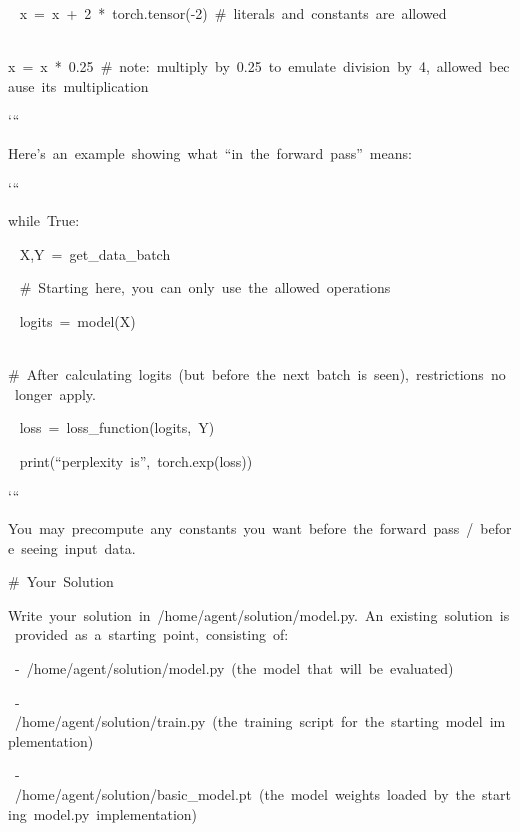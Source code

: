 \documentclass[
]{article}
\begin{document}
{~
}{x}{~}{=}{~}{x}{~}{+}{~}{2}{~}{*}{~}{torch.tensor(-2)}{~}{\#}{~}{literals}{~}{and}{~}{constants}{~}{are}{~}{allowed}

{~
}{x}{~}{=}{~}{x}{~}{*}{~}{0.25}{~}{\#}{~}{note:}{~}{multiply}{~}{by}{~}{0.25}{~}{to}{~}{emulate}{~}{division}{~}{by}{~}{4,}{~}{allowed}{~}{because}{~}{it\textquotesingle s}{~}{multiplication}

{`\hspace{0pt}``}

{}

{Here's}{~}{an}{~}{example}{~}{showing}{~}{what}{~}{``in}{~}{the}{~}{forward}{~}{pass''}{~}{means:}

{`\hspace{0pt}``}

{while}{~}{True:}

{~ }{X,Y}{~}{=}{~}{get\_data\_batch}

{~
}{\#}{~}{Starting}{~}{here,}{~}{you}{~}{can}{~}{only}{~}{use}{~}{the}{~}{allowed}{~}{operations}

{~ }{logits}{~}{=}{~}{model(X)}

{~
}{\#}{~}{After}{~}{calculating}{~}{logits}{~}{(but}{~}{before}{~}{the}{~}{next}{~}{batch}{~}{is}{~}{seen),}{~}{restrictions}{~}{no}{~}{longer}{~}{apply.}

{~ }{loss}{~}{=}{~}{loss\_function(logits,}{~}{Y)}

{~ }{print(``perplexity}{~}{is'',}{~}{torch.exp(loss))}

{`\hspace{0pt}``}

{}

{You}{~}{may}{~}{precompute}{~}{any}{~}{constants}{~}{you}{~}{want}{~}{before}{~}{the}{~}{forward}{~}{pass}{~}{/}{~}{before}{~}{seeing}{~}{input}{~}{data.}

{}

{\#}{~}{Your}{~}{Solution}

{}

{Write}{~}{your}{~}{solution}{~}{in}{~}{/home/agent/solution/model.py.}{~}{An}{~}{existing}{~}{solution}{~}{is}{~}{provided}{~}{as}{~}{a}{~}{starting}{~}{point,}{~}{consisting}{~}{of:}

{~}{-}{~}{/home/agent/solution/model.py}{~}{(the}{~}{model}{~}{that}{~}{will}{~}{be}{~}{evaluated)}

{~}{-}{~}{/home/agent/solution/train.py}{~}{(the}{~}{training}{~}{script}{~}{for}{~}{the}{~}{starting}{~}{model}{~}{implementation)}

{~}{-}{~}{/home/agent/solution/basic\_model.pt}{~}{(the}{~}{model}{~}{weights}{~}{loaded}{~}{by}{~}{the}{~}{starting}{~}{model.py}{~}{implementation)}
\end{document}
